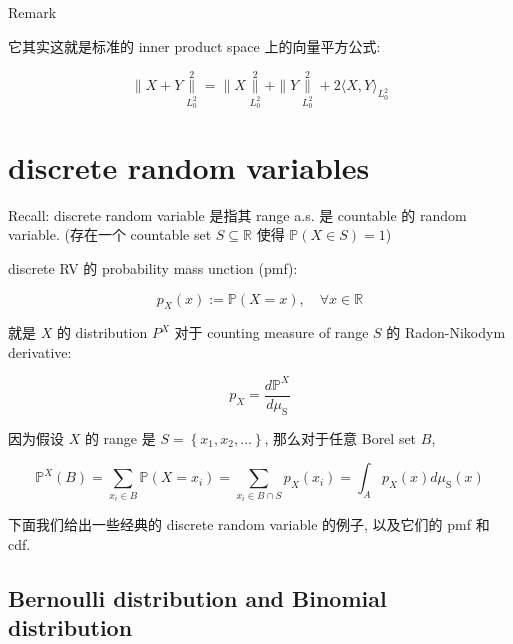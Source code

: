 \begin{qlremark}{Remark}

它其实这就是标准的 inner product space 上的向量平方公式:

\[\parallel \mathit{X} + \mathit{Y}\underset{\mathit{L}_{0}^{2}}{\overset{2}{\parallel}} = \parallel \mathit{X}\underset{\mathit{L}_{0}^{2}}{\overset{2}{\parallel}} + \parallel \mathit{Y}\underset{\mathit{L}_{0}^{2}}{\overset{2}{\parallel}} + 2\langle\mathit{X},\mathit{Y}\rangle_{\mathit{L}_{0}^{2}}\]

\end{qlremark}

\section{discrete random variables}\label{discrete-random-variables}

Recall: discrete random variable 是指其 range a.s. 是 countable 的 random variable. (存在一个 countable set \(\mathit{S} \subseteq \mathbb{R}\) 使得 \(\mathbb{P}(\mathit{X} \in \mathit{S}) = 1\))

discrete RV 的 probability mass unction (pmf):

\[\mathit{p}_{\mathit{X}}(\mathit{x}) := \mathbb{P}(\mathit{X} = \mathit{x}),\quad\forall\mathit{x} \in \mathbb{R}\]

就是 \(\mathit{X}\) 的 distribution \(\mathit{P}^{\mathit{X}}\) 对于 counting measure of range \(\mathit{S}\) 的 Radon-Nikodym derivative:

\[\mathit{p}_{\mathit{X}} = \frac{\mathit{d}\mathbb{P}^{\mathit{X}}}{\mathit{d}\mathit{\mu}_{\text{S}}}\]

因为假设 \(\mathit{X}\) 的 range 是 \(\mathit{S} = \left\{ {\mathit{x}_{1},\mathit{x}_{2},\ldots} \right\}\), 那么对于任意 Borel set \(\mathit{B}\),

\[\mathbb{P}^{\mathit{X}}(\mathit{B}) = \sum\limits_{\mathit{x}_{\mathit{i}} \in \mathit{B}}\mathbb{P}(\mathit{X} = \mathit{x}_{\mathit{i}}) = \sum\limits_{\mathit{x}_{\mathit{i}} \in \mathit{B} \cap \mathit{S}}\mathit{p}_{\mathit{X}}(\mathit{x}_{\mathit{i}}) = \int_{\mathit{A}}\mathit{p}_{\mathit{X}}(\mathit{x})\mathit{d}\mathit{\mu}_{\text{S}}(\mathit{x})\]

下面我们给出一些经典的 discrete random variable 的例子, 以及它们的 pmf 和 cdf.

\subsection{Bernoulli distribution and Binomial distribution}\label{bernoulli-distribution-and-binomial-distribution}

